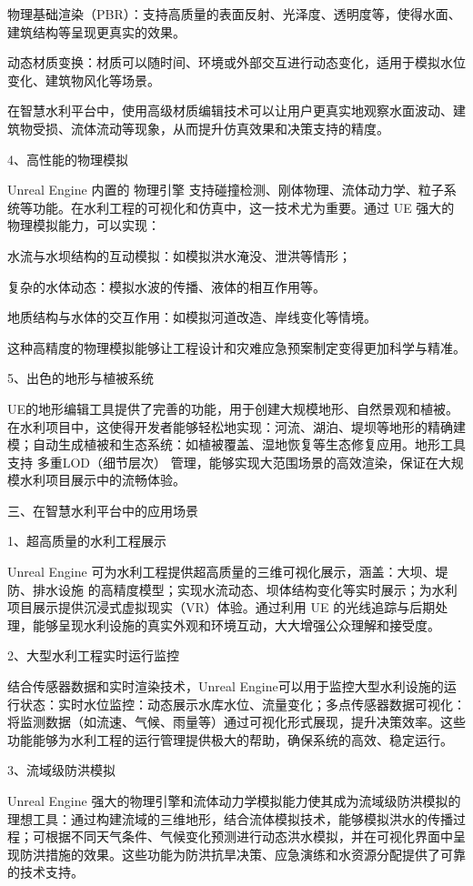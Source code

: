 物理基础渲染（PBR）：支持高质量的表面反射、光泽度、透明度等，使得水面、建筑结构等呈现更真实的效果。

动态材质变换：材质可以随时间、环境或外部交互进行动态变化，适用于模拟水位变化、建筑物风化等场景。

在智慧水利平台中，使用高级材质编辑技术可以让用户更真实地观察水面波动、建筑物受损、流体流动等现象，从而提升仿真效果和决策支持的精度。

4、高性能的物理模拟

Unreal Engine 内置的 物理引擎 支持碰撞检测、刚体物理、流体动力学、粒子系统等功能。在水利工程的可视化和仿真中，这一技术尤为重要。通过 UE 强大的物理模拟能力，可以实现：

水流与水坝结构的互动模拟：如模拟洪水淹没、泄洪等情形；

复杂的水体动态：模拟水波的传播、液体的相互作用等。

地质结构与水体的交互作用：如模拟河道改造、岸线变化等情境。

这种高精度的物理模拟能够让工程设计和灾难应急预案制定变得更加科学与精准。

5、出色的地形与植被系统

UE的地形编辑工具提供了完善的功能，用于创建大规模地形、自然景观和植被。在水利项目中，这使得开发者能够轻松地实现：河流、湖泊、堤坝等地形的精确建模；自动生成植被和生态系统：如植被覆盖、湿地恢复等生态修复应用。地形工具支持 多重LOD（细节层次） 管理，能够实现大范围场景的高效渲染，保证在大规模水利项目展示中的流畅体验。

三、在智慧水利平台中的应用场景

1、超高质量的水利工程展示

Unreal Engine 可为水利工程提供超高质量的三维可视化展示，涵盖：大坝、堤防、排水设施 的高精度模型；实现水流动态、坝体结构变化等实时展示；为水利项目展示提供沉浸式虚拟现实（VR）体验。通过利用 UE 的光线追踪与后期处理，能够呈现水利设施的真实外观和环境互动，大大增强公众理解和接受度。

2、大型水利工程实时运行监控

结合传感器数据和实时渲染技术，Unreal Engine可以用于监控大型水利设施的运行状态：实时水位监控：动态展示水库水位、流量变化；多点传感器数据可视化：将监测数据（如流速、气候、雨量等）通过可视化形式展现，提升决策效率。这些功能能够为水利工程的运行管理提供极大的帮助，确保系统的高效、稳定运行。

3、流域级防洪模拟

Unreal Engine 强大的物理引擎和流体动力学模拟能力使其成为流域级防洪模拟的理想工具：通过构建流域的三维地形，结合流体模拟技术，能够模拟洪水的传播过程；可根据不同天气条件、气候变化预测进行动态洪水模拟，并在可视化界面中呈现防洪措施的效果。这些功能为防洪抗旱决策、应急演练和水资源分配提供了可靠的技术支持。

